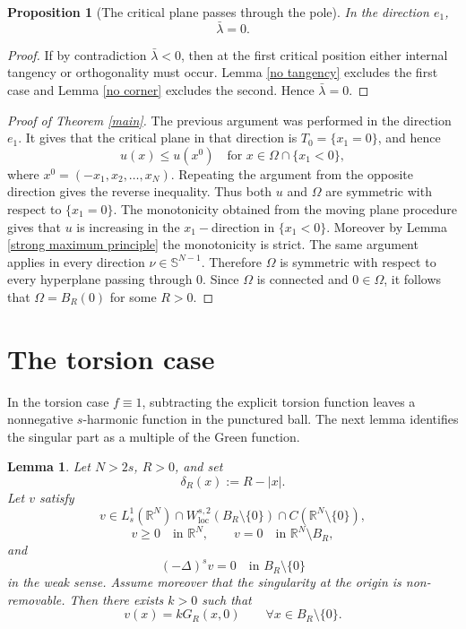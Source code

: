 \documentclass[11pt,a4paper]{article}
\newtheorem{proposition}[theorem]{Proposition}
\newtheorem{lemma}[theorem]{Lemma}
\newcommand{\loc}{\mathrm{loc}}
\begin{document}
\begin{proposition}[The critical plane passes through the pole]
In the direction \(e_1\),
\[
\bar\lambda=0.
\]
\end{proposition}

\begin{proof}
If by contradiction \(\bar\lambda<0\), then at the first critical position either internal tangency or orthogonality must occur. Lemma \ref{no tangency} excludes the first case and Lemma \ref{no corner} excludes the second. Hence \(\bar\lambda=0\).
\end{proof}

\begin{proof}[Proof of Theorem \ref{main}]
The previous argument was performed in the direction \(e_1\). It gives that the critical plane in that direction is \(T_0=\{x_1=0\}\), and hence
\[
u(x)\le u(x^0)
\quad\text{for }x\in\Omega\cap\{x_1<0\},
\]
where \(x^0=(-x_1,x_2,\dots,x_N)\). Repeating the argument from the opposite direction gives the reverse inequality. Thus both \(u\) and \(\Omega\) are symmetric with respect to \(\{x_1=0\}\). The monotonicity obtained from the moving plane procedure gives that \(u\) is increasing in the $x_{1}-$direction in $\{x_{1}<0\}$. Moreover by Lemma \ref{strong maximum principle} the monotonicity is strict.
The same argument applies in every direction \(\nu\in\mathbb S^{N-1}\). Therefore \(\Omega\) is symmetric with respect to every hyperplane passing through \(0\). Since \(\Omega\) is connected and \(0\in\Omega\), it follows that \(\Omega=B_R(0)\) for some \(R>0\). 
\end{proof}


\section{The torsion case}
\label{sec:torsion}

In the torsion case \(f\equiv1\), subtracting the explicit torsion function leaves a nonnegative \(s\)-harmonic function in the punctured ball. The next lemma identifies the singular part as a multiple of the Green function.

\begin{lemma}
\label{identificazione parte singolare}
Let \(N>2s\), \(R>0\), and set
\[
\delta_R(x):=R-|x|.
\]
Let \(v\) satisfy
\[
v\in L^1_s(\mathbb R^N)
\cap W^{s,2}_{\loc}(B_R\setminus\{0\})
\cap C(\mathbb R^N\setminus\{0\}),
\]
\[
v\ge0 \quad\text{in }\mathbb R^N,
\qquad
v=0 \quad\text{in }\mathbb R^N\setminus B_R,
\]
and
\[
(-\Delta)^s v=0
\quad\text{in }B_R\setminus\{0\}
\]
in the weak sense. Assume moreover that the singularity at the origin is
non-removable. Then there exists \(k>0\) such that
\[
v(x)=kG_R(x,0)
\qquad \forall x\in B_R\setminus\{0\}.
\]
\end{lemma}
\end{document}
